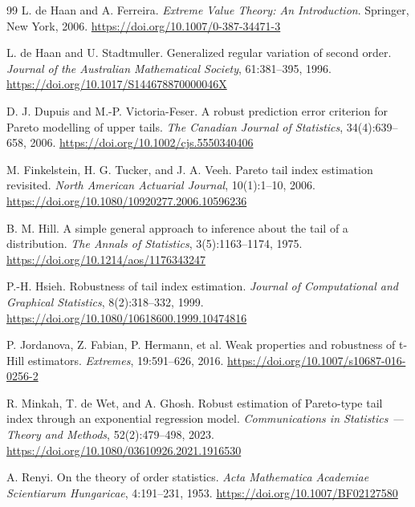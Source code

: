 \documentclass[11pt]{article}
\begin{document}
\begin{thebibliography}{99}
L. de Haan and A. Ferreira.
\newblock \emph{Extreme Value Theory: An Introduction}.
\newblock Springer, New York, 2006.
\newblock \url{https://doi.org/10.1007/0-387-34471-3}

L. de Haan and U. Stadtmuller.
\newblock Generalized regular variation of second order.
\newblock \emph{Journal of the Australian Mathematical Society}, 61:381--395,
1996.
\newblock \url{https://doi.org/10.1017/S144678870000046X}

D. J. Dupuis and M.-P. Victoria-Feser.
\newblock A robust prediction error criterion for Pareto modelling of upper
tails.
\newblock \emph{The Canadian Journal of Statistics}, 34(4):639--658, 2006.
\newblock \url{https://doi.org/10.1002/cjs.5550340406}

M. Finkelstein, H. G. Tucker, and J. A. Veeh.
\newblock Pareto tail index estimation revisited.
\newblock \emph{North American Actuarial Journal}, 10(1):1--10, 2006.
\newblock \url{https://doi.org/10.1080/10920277.2006.10596236}

B. M. Hill.
\newblock A simple general approach to inference about the tail of a
distribution.
\newblock \emph{The Annals of Statistics}, 3(5):1163--1174, 1975.
\newblock \url{https://doi.org/10.1214/aos/1176343247}

P.-H. Hsieh.
\newblock Robustness of tail index estimation.
\newblock \emph{Journal of Computational and Graphical Statistics},
8(2):318--332, 1999.
\newblock \url{https://doi.org/10.1080/10618600.1999.10474816}

P. Jordanova, Z. Fabian, P. Hermann, et al.
\newblock Weak properties and robustness of t-Hill estimators.
\newblock \emph{Extremes}, 19:591--626, 2016.
\newblock \url{https://doi.org/10.1007/s10687-016-0256-2}

R. Minkah, T. de Wet, and A. Ghosh.
\newblock Robust estimation of Pareto-type tail index through an exponential
regression model.
\newblock \emph{Communications in Statistics --- Theory and Methods},
52(2):479--498, 2023.
\newblock \url{https://doi.org/10.1080/03610926.2021.1916530}

A. Renyi.
\newblock On the theory of order statistics.
\newblock \emph{Acta Mathematica Academiae Scientiarum Hungaricae}, 4:191--231,
1953.
\newblock \url{https://doi.org/10.1007/BF02127580}


\end{thebibliography}
\end{document}
